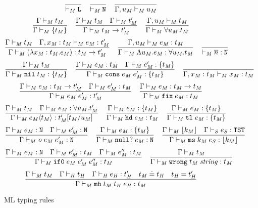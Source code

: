 \begin{figure}[p]
\[
\frac
{}
{ \vdash_{\mathit{M}} \mathtt{L}}
\quad
\frac
{}
{ \vdash_{\mathit{M}} \mathtt{N}}
\quad
\frac
{}
{\Gamma , u_{\mathit{M}} \vdash_{\mathit{M}} u_{\mathit{M}}}
\]
\[
\frac
{\Gamma \vdash_{\mathit{M}} t_{\mathit{M}}}
{\Gamma \vdash_{\mathit{M}} \lbrace t_{\mathit{M}} \rbrace}
\quad
\frac
{\Gamma \vdash_{\mathit{M}} t_{\mathit{M}} \quad \Gamma \vdash_{\mathit{M}} t_{\mathit{M}}'}
{\Gamma \vdash_{\mathit{M}} t_{\mathit{M}} \rightarrow t_{\mathit{M}}'}
\quad
\frac
{\Gamma, u_{\mathit{M}} \vdash_{\mathit{M}} t_{\mathit{M}}}
{\Gamma \vdash_{\mathit{M}} \forall u_{\mathit{M}} . t_{\mathit{M}}}
\]
\bigskip
\[
\frac
{\Gamma \vdash_{\mathit{M}} t_{\mathit{M}} \quad \Gamma , x_{\mathit{M}} : t_{\mathit{M}} \vdash_{\mathit{M}} e_{\mathit{M}} : t_{\mathit{M}}'}
{\Gamma \vdash_{\mathit{M}} (\lambda x_{\mathit{M}} : t_{\mathit{M}} . e_{\mathit{M}}) : t_{\mathit{M}} \rightarrow t_{\mathit{M}}'}
\quad
\frac
{\Gamma , u_{\mathit{M}} \vdash_{\mathit{M}} e_{\mathit{M}} : t_{\mathit{M}}}
{\Gamma \vdash_{\mathit{M}} \Lambda u_{\mathit{M}} . e_{\mathit{M}} : \forall u_{\mathit{M}} . t_{\mathit{M}}}
\quad
\frac
{}
{ \vdash_{\mathit{M}} \overline{n} : \mathtt{N}}
\]
\[
\frac
{\Gamma \vdash_{\mathit{M}} t_{\mathit{M}}}
{\Gamma \vdash_{\mathit{M}} \mathtt{nil} \; t_{\mathit{M}} : \lbrace t_{\mathit{M}} \rbrace}
\quad
\frac
{\Gamma \vdash_{\mathit{M}} e_{\mathit{M}} : t_{\mathit{M}} \quad \Gamma \vdash_{\mathit{M}} e_{\mathit{M}}' : \lbrace t_{\mathit{M}} \rbrace}
{\Gamma \vdash_{\mathit{M}} \mathtt{cons} \; e_{\mathit{M}} \; e_{\mathit{M}}' : \lbrace t_{\mathit{M}} \rbrace}
\quad
\frac
{}
{\Gamma , x_{\mathit{M}} : t_{\mathit{M}} \vdash_{\mathit{M}} x_{\mathit{M}} : t_{\mathit{M}}}
\]
\[
\frac
{\Gamma \vdash_{\mathit{M}} e_{\mathit{M}} : t_{\mathit{M}} \rightarrow t_{\mathit{M}}' \quad \Gamma \vdash_{\mathit{M}} e_{\mathit{M}}' : t_{\mathit{M}}}
{\Gamma\vdash_{\mathit{H}}e_{\mathit{M}} \; e_{\mathit{M}}':t_{\mathit{M}}'}
\quad
\frac
{\Gamma \vdash_{\mathit{M}} e_{\mathit{M}} : t_{\mathit{M}} \rightarrow t_{\mathit{M}}}
{\Gamma \vdash_{\mathit{M}} \mathtt{fix} \; e_{\mathit{M}} : t_{\mathit{M}}}
\]
\[
\frac
{\Gamma \vdash_{\mathit{M}} t_{\mathit{M}} \quad \Gamma \vdash_{\mathit{M}} e_{\mathit{M}} : \forall u_{\mathit{M}} . t_{\mathit{M}}'}
{\Gamma \vdash_{\mathit{M}} e_{\mathit{M}} \langle t_{\mathit{M}} \rangle : t_{\mathit{M}}'[t_{\mathit{M}}/u_{\mathit{M}}]}
\quad
\frac
{\Gamma \vdash_{\mathit{M}} e_{\mathit{M}} : \lbrace t_{\mathit{M}} \rbrace}
{\Gamma \vdash_{\mathit{M}} \mathtt{hd} \; e_{\mathit{M}} : t_{\mathit{M}}}
\quad
\frac
{\Gamma \vdash_{\mathit{M}} e_{\mathit{M}} : \lbrace t_{\mathit{M}} \rbrace}
{\Gamma \vdash_{\mathit{M}} \mathtt{tl} \; e_{\mathit{M}} : \lbrace t_{\mathit{M}} \rbrace}
\]
\[
\frac
{\Gamma \vdash_{\mathit{M}} e_{\mathit{M}} : \mathtt{N} \quad \Gamma \vdash_{\mathit{M}} e_{\mathit{M}}' : \mathtt{N}}
{\Gamma \vdash_{\mathit{M}} \mathit{o} \; e_{\mathit{M}} \; e_{\mathit{M}}' : \mathtt{N}}
\quad
\frac
{\Gamma \vdash_{\mathit{M}} e_{\mathit{M}} : \lbrace t_{\mathit{M}} \rbrace}
{\Gamma \vdash_{\mathit{M}} \mathtt{null?} \; e_{\mathit{M}} : \mathtt{N}}
\quad
\frac
{\Gamma \vdash_{\mathit{M}} \lfloor k_{\mathit{M}} \rfloor \quad \Gamma \vdash_{\mathit{S}} e_{\mathit{S}} : \mathtt{TST}}
{\Gamma \vdash_{\mathit{M}} \mathtt{ms} \; k_{\mathit{M}} \; e_{\mathit{S}} : \lfloor k_{\mathit{M}} \rfloor}
\]
\[
\frac
{\Gamma \vdash_{\mathit{M}} e_{\mathit{M}} : \mathtt{N} \quad \Gamma \vdash_{\mathit{M}} e_{\mathit{M}}' : t_{\mathit{M}} \quad \Gamma \vdash_{\mathit{M}} e_{\mathit{M}}'' : t_{\mathit{M}}}
{\Gamma \vdash_{\mathit{M}} \mathtt{if0} \; e_{\mathit{M}} \; e_{\mathit{M}}' \; e_{\mathit{M}}'' : t_{\mathit{M}}}
\quad
\frac
{\Gamma \vdash_{\mathit{M}} t_{\mathit{M}}}
{\Gamma \vdash_{\mathit{M}} \mathtt{wrong} \; t_{\mathit{M}} \; \mathit{string} : t_{\mathit{M}}}
\]
\[
\frac
{\Gamma \vdash_{\mathit{M}} t_{\mathit{M}} \quad \Gamma \vdash_{\mathit{H}} t_{\mathit{H}} \quad \Gamma \vdash_{\mathit{H}} e_{\mathit{H}} : t_{\mathit{H}}' \quad t_{\mathit{M}} \doteq t_{\mathit{H}} \quad t_{\mathit{H}} = t_{\mathit{H}}'}
{\Gamma \vdash_{\mathit{M}} \mathtt{mh} \; t_{\mathit{M}} \; t_{\mathit{H}} \; e_{\mathit{H}} : t_{\mathit{M}}}
\]
\caption{ML typing rules}
\label{mtr}
\end{figure}
